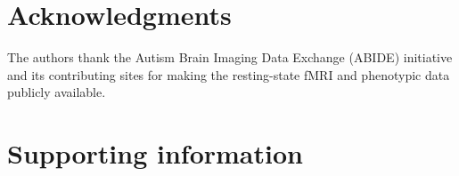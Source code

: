 \documentclass[10pt,letterpaper]{article}
\begin{document}
\section*{Acknowledgments}

The authors thank the Autism Brain Imaging Data Exchange (ABIDE) initiative and its contributing
sites for making the resting-state fMRI and phenotypic data publicly available.

\nolinenumbers



\clearpage
\section*{Supporting information}
\renewcommand{\thetable}{S\arabic{table}}
\renewcommand{\thefigure}{S\arabic{figure}}
\setcounter{table}{0}
\setcounter{figure}{0}
\end{document}
